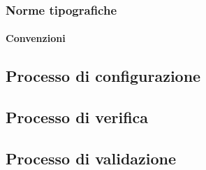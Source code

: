 \subsubsection{Norme tipografiche}

\paragraph{Convenzioni}





\subsection{Processo di configurazione}

\subsection{Processo di verifica}

\subsection{Processo di validazione}
